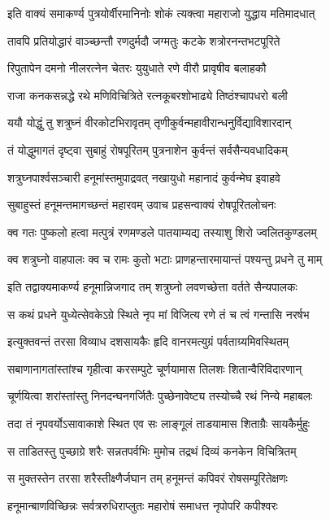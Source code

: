 \twolineshloka
{इति वाक्यं समाकर्ण्य पुत्रयोर्वीरमानिनोः}
{शोकं त्यक्त्वा महाराजो युद्धाय मतिमादधात्}%

\twolineshloka
{तावपि प्रतियोद्धारं वाञ्च्छन्तौ रणदुर्मदौ}
{जग्मतुः कटके शत्रोरनन्तभटपूरिते}%

\twolineshloka
{रिपुतापेन दमनो नीलरत्नेन चेतरः}
{युयुधाते रणे वीरौ प्रावृषीव बलाहकौ}%

\twolineshloka
{राजा कनकसन्नद्धे रथे मणिविचित्रिते}
{रत्नकूबरशोभाढ्ये तिष्ठंश्चापधरो बली}%

\twolineshloka
{ययौ योद्धुं तु शत्रुघ्नं वीरकोटभिरावृतम्}
{तृणीकुर्वन्महावीरान्धनुर्विद्याविशारदान्}%

\twolineshloka
{तं योद्धुमागतं दृष्ट्वा सुबाहुं रोषपूरितम्}
{पुत्रनाशेन कुर्वन्तं सर्वसैन्यवधादिकम्}%

\twolineshloka
{शत्रुघ्नपार्श्वसञ्चारी हनूमांस्तमुपाद्रवत्}
{नखायुधो महानादं कुर्वन्मेघ इवाहवे}%

\twolineshloka
{सुबाहुस्तं हनूमन्तमागच्छन्तं महारवम्}
{उवाच प्रहसन्वाक्यं रोषपूरितलोचनः}%

\twolineshloka
{क्व गतः पुष्कलो हत्वा मत्पुत्रं रणमण्डले}
{पातयाम्यद्य तस्याशु शिरो ज्वलितकुण्डलम्}%

\twolineshloka
{क्व शत्रुघ्नो वाहपालः क्व च रामः कुतो भटाः}
{प्राणहन्तारमायान्तं पश्यन्तु प्रधने तु माम्}%

\twolineshloka
{इति तद्वाक्यमाकर्ण्य हनूमान्निजगाद तम्}
{शत्रुघ्नो लवणच्छेत्ता वर्तते सैन्यपालकः}%

\twolineshloka
{स कथं प्रधने युध्येत्सेवकेऽग्रे स्थिते नृप}
{मां विजित्य रणे तं च त्वं गन्तासि नरर्षभ}%

\twolineshloka
{इत्युक्तवन्तं तरसा विव्याध दशसायकैः}
{हृदि वानरमत्युग्रं पर्वताग्र्यमिवस्थितम्}%

\twolineshloka
{सबाणानागतांस्तांश्च गृहीत्वा करसम्पुटे}
{चूर्णयामास तिलशः शितान्वैरिविदारणान्}%

\twolineshloka
{चूर्णयित्वा शरांस्तांस्तु निनदन्घनगर्जितैः}
{पुच्छेनावेष्ट्य तस्योच्चै रथं निन्ये महाबलः}%

\twolineshloka
{तदा तं नृपवर्योऽसावाकाशे स्थित एव सः}
{लाङ्गूलं ताडयामास शिताग्रैः सायकैर्मुहुः}%

\twolineshloka
{स ताडितस्तु पुच्छाग्रे शरैः सन्नतपर्वभिः}
{मुमोच तद्रथं दिव्यं कनकेन विचित्रितम्}%

\twolineshloka
{स मुक्तस्तेन तरसा शरैस्तीक्ष्णैर्जघान तम्}
{हनूमन्तं कपिवरं रोषसम्पूरितेक्षणः}%

\twolineshloka
{हनूमान्बाणविच्छिन्नः सर्वत्ररुधिराप्लुतः}
{महारोषं समाधत्त नृपोपरि कपीश्वरः}%

